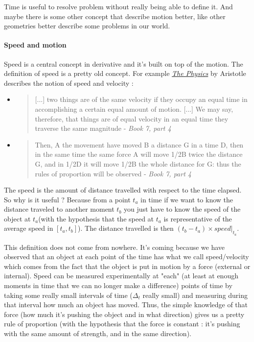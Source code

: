\documentclass[12pt]{article}
\begin{document}
\bigskip

Time is useful to resolve problem without really being able to define it. And maybe there is some other concept that describe motion better, like other geometries better describe some problems in our world.

\paragraph{Speed and motion}

Speed is a central concept in derivative and it's built on top of the motion. The definition of speed is a pretty old concept. For example \href{http://classics.mit.edu/Aristotle/physics.7.vii.html}{\it The Physics} by Aristotle describes the notion of speed and velocity :
\begin{itemize}
    \item
\begin{quote}
[...] two things are of the same velocity if they occupy an equal time in accomplishing a certain equal amount of motion. [...] We may say, therefore, that things are of equal velocity in an equal time they traverse the same magnitude - {\it Book 7, part 4}
\end{quote}

    \item
\begin{quote}
 Then, A the movement have moved B a distance G in a time D, then in the same time the same force A will move 1/2B twice the distance G, and in 1/2D it will move 1/2B the whole distance for G: thus the rules of proportion will be observed - {\it Book 7, part 4}
\end{quote}
\end{itemize}


The speed is the amount of distance travelled with respect to the time elapsed. So why is it useful ? Because from a point $t_a$ in time if we want to know the distance traveled to another moment $t_b$ you just have to know the speed of the object at $t_a$(with the hypothesis that the speed at $t_a$ is representative of the average speed in $[t_a, t_b]$). The distance travelled is then $(t_b-t_a) \times speed|_{t_a}$.

This definition does not come from nowhere. It's coming because we have observed that an object at each point of the time has what we call speed/velocity which comes from the fact that the object is put in motion by a force (external or internal). 
Speed can be measured experimentally at "each" (at least at enough moments in time that we can no longer make a difference) points of time by taking some really small intervals of time ($\Delta_t$ really small) and measuring during that interval how much an object has moved.
Thus, the simple knowledge of that force (how much it's pushing the object and in what direction) gives us a pretty rule of proportion (with the hypothesis that the force is constant : it's pushing with the same amount of strength, and in the same direction). 
\end{document}
